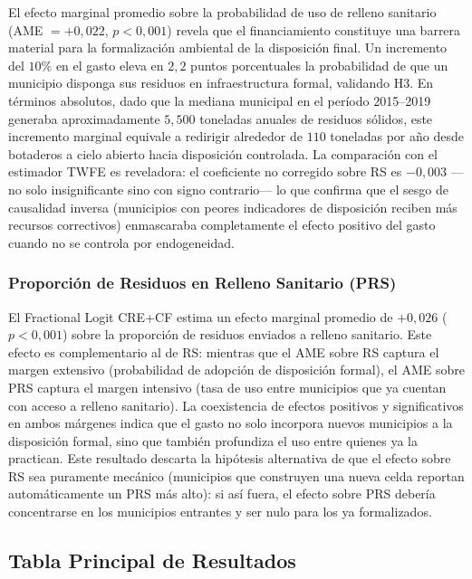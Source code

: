 El efecto marginal promedio sobre la probabilidad de uso de relleno sanitario (AME $= +0{,}022$, $p < 0{,}001$) revela que el financiamiento constituye una barrera material para la formalización ambiental de la disposición final. Un incremento del $10\%$ en el gasto eleva en $2{,}2$ puntos porcentuales la probabilidad de que un municipio disponga sus residuos en infraestructura formal, validando H3. En términos absolutos, dado que la mediana municipal en el período 2015--2019 generaba aproximadamente $5{,}500$ toneladas anuales de residuos sólidos, este incremento marginal equivale a redirigir alrededor de $110$ toneladas por año desde botaderos a cielo abierto hacia disposición controlada. La comparación con el estimador TWFE es reveladora: el coeficiente no corregido sobre RS es $-0{,}003$ ---no solo insignificante sino con signo contrario--- lo que confirma que el sesgo de causalidad inversa (municipios con peores indicadores de disposición reciben más recursos correctivos) enmascaraba completamente el efecto positivo del gasto cuando no se controla por endogeneidad.

\subsubsection*{Proporción de Residuos en Relleno Sanitario (PRS)}

El Fractional Logit CRE+CF \citep{PapkeWooldridge1996} estima un efecto marginal promedio de $+0{,}026$ ($p < 0{,}001$) sobre la proporción de residuos enviados a relleno sanitario. Este efecto es complementario al de RS: mientras que el AME sobre RS captura el margen extensivo (probabilidad de adopción de disposición formal), el AME sobre PRS captura el margen intensivo (tasa de uso entre municipios que ya cuentan con acceso a relleno sanitario). La coexistencia de efectos positivos y significativos en ambos márgenes indica que el gasto no solo incorpora nuevos municipios a la disposición formal, sino que también profundiza el uso entre quienes ya la practican. Este resultado descarta la hipótesis alternativa de que el efecto sobre RS sea puramente mecánico (municipios que construyen una nueva celda reportan automáticamente un PRS más alto): si así fuera, el efecto sobre PRS debería concentrarse en los municipios entrantes y ser nulo para los ya formalizados.

\subsection{Tabla Principal de Resultados}
\label{sec:tabla_principal}

